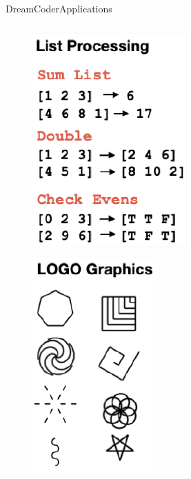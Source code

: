 \documentclass[AERbeamer%
              ,optEnglish%
              ,optBiber%
              ,optBibstyleAlphabetic%
              ,optBeamerClassicFormat%
              ]{AERlatex}%
\begin{document}
\begin{frame}[c]{DreamCoder}{Applications}
    \begin{columns}[T]
        \begin{column}{0.33\textwidth}
            \begin{figure}
                \centering
                \includegraphics[height=0.35\textheight]{DreamCoderApp1.png}
            \end{figure}
            \begin{figure}
                \centering
                \includegraphics[height=0.35\textheight]{DreamCoderApp4.png}
            \end{figure}
        \end{column}
        \begin{column}{0.33\textwidth}

\end{column}
\end{columns}
\end{frame}
\end{document}
